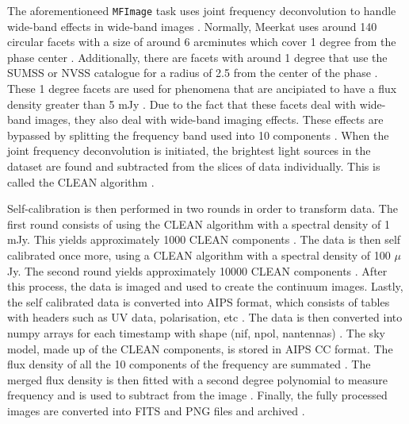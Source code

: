 \documentclass[preprint,linenumbers, longauthor]{aastex631}
\begin{document}
The aforementioneed \texttt{MFImage} task uses joint frequency deconvolution to handle wide-band effects in wide-band images \citep{ratcliffeSDPPipelinesOverview2021}. 
Normally, Meerkat uses around 140 circular facets with a size of around 6 arcminutes which cover 1 degree from the phase center \citep{ratcliffeSDPPipelinesOverview2021}.
Additionally, there are facets with around 1 degree that  use the SUMSS or NVSS catalogue for a radius of 2.5 from the center of the phase \cite{ratcliffeSDPPipelinesOverview2021}.
These 1 degree facets are used for phenomena that are ancipiated to have a flux density greater than 5 mJy \cite{ratcliffeSDPPipelinesOverview2021}.
Due to the fact that these facets deal with wide-band images, they also deal with wide-band imaging effects. These effects are bypassed by splitting the frequency band used into 10 components \citep{ratcliffeSDPPipelinesOverview2021}. 
When the joint frequency deconvolution is initiated, the brightest light sources in the dataset are found and subtracted from the slices of data individually. This is called the CLEAN algorithm \citep{ratcliffeSDPPipelinesOverview2021}.

Self-calibration is then performed in two rounds in order to transform data. The first round consists of using the CLEAN algorithm with a spectral density of 1 mJy. This yields approximately 1000 CLEAN components \citep{ratcliffeSDPPipelinesOverview2021}. 
The data is then self calibrated once more, using a CLEAN algorithm with a spectral density of 100 $\mu$Jy. The second round yields approximately 10000 CLEAN components \citep{ratcliffeSDPPipelinesOverview2021}.
After this process, the data is imaged and used to create the continuum images.
Lastly, the self calibrated data is converted into AIPS format, which consists of tables with headers such as UV data, polarisation, etc \citep{ratcliffeSDPPipelinesOverview2021}. The data is then converted into numpy arrays for each timestamp with shape (nif, npol, nantennas) \citep{ratcliffeSDPPipelinesOverview2021}. 
The sky model, made up of the CLEAN components, is stored in AIPS CC format. The flux density of all the 10 components of the frequency are summated \citep{ratcliffeSDPPipelinesOverview2021}. The merged flux density is then fitted with a second degree polynomial to measure frequency and is used to subtract from the image \citep{ratcliffeSDPPipelinesOverview2021}.
Finally, the fully processed images are converted into FITS and PNG files and archived \citep{ratcliffeSDPPipelinesOverview2021}.
\end{document}
